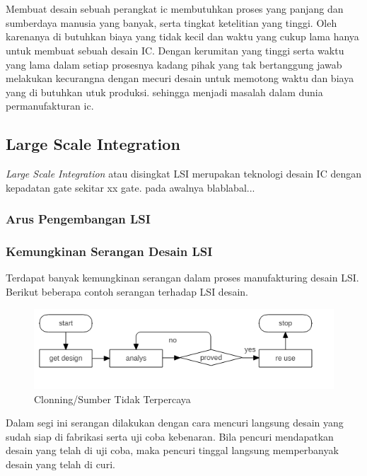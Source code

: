 \chapter{\babDua}
Membuat desain sebuah perangkat ic membutuhkan proses yang panjang dan sumberdaya manusia yang banyak, serta tingkat ketelitian yang tinggi. Oleh karenanya di butuhkan biaya yang tidak kecil dan waktu yang cukup lama hanya untuk membuat sebuah desain IC. Dengan kerumitan yang tinggi serta waktu yang lama dalam setiap prosesnya kadang pihak yang tak bertanggung jawab melakukan kecurangna dengan mecuri desain untuk memotong waktu dan biaya yang di butuhkan utuk produksi. sehingga menjadi masalah dalam dunia permanufakturan ic.

\section{Large Scale Integration}
\textit{Large Scale Integration} atau disingkat LSI merupakan teknologi desain IC dengan kepadatan gate sekitar xx gate. pada awalnya blablabal...

\subsection{Arus Pengembangan LSI}

\subsection{Kemungkinan Serangan Desain LSI}
Terdapat banyak kemungkinan serangan dalam proses manufakturing desain LSI. Berikut beberapa contoh serangan terhadap LSI desain.

\begin{figure}
	\centering
	\includegraphics[width=1.05\textwidth]
	{diagrams/untrustSource.png}
	\caption{Clonning/Sumber Tidak Terpercaya}
	\label{fig:untrustsource}
\end{figure}

Dalam segi ini serangan dilakukan dengan cara mencuri langsung desain yang sudah siap di fabrikasi serta uji coba kebenaran. Bila pencuri mendapatkan desain yang telah di uji coba, maka pencuri tinggal langsung memperbanyak desain yang telah di curi.

